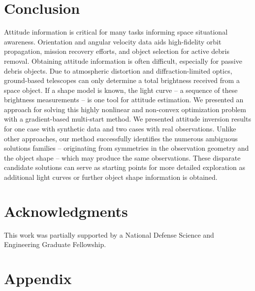 \documentclass[a4paper,twocolumn]{spaceDebrisC} %
\begin{document}
\section{Conclusion}

Attitude information is critical for many tasks informing space situational awareness. Orientation and angular velocity data aids high-fidelity orbit propagation, mission recovery efforts, and object selection for active debris removal. Obtaining attitude information is often difficult, especially for passive debris objects. Due to atmospheric distortion and diffraction-limited optics, ground-based telescopes can only determine a total brightness received from a space object. If a shape model is known, the light curve -- a sequence of these brightness measurements -- is one tool for attitude estimation. We presented an approach for solving this highly nonlinear and non-convex optimization problem with a gradient-based multi-start method. We presented attitude inversion results for one case with synthetic data and two cases with real observations. Unlike other approaches, our method successfully identifies the numerous ambiguous solutions families -- originating from symmetries in the observation geometry and the object shape -- which may produce the same observations. These disparate candidate solutions can serve as starting points for more detailed exploration as additional light curves or further object shape information is obtained.

\section*{Acknowledgments}

This work was partially supported by a National Defense Science and Engineering Graduate Fellowship.

\section*{Appendix}
\end{document}
